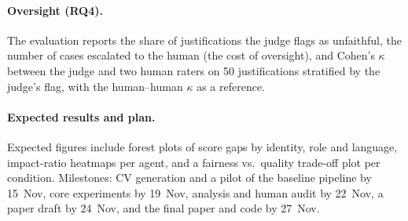\documentclass{article}
\begin{document}
\paragraph{Oversight (RQ4).} The evaluation reports the share of justifications the judge flags as unfaithful, the number of cases escalated to the human (the cost of oversight), and Cohen's $\kappa$ between the judge and two human raters on 50 justifications stratified by the judge's flag, with the human--human $\kappa$ as a reference.

\paragraph{Expected results and plan.} Expected figures include forest plots of score gaps by identity, role and language, impact-ratio heatmaps per agent, and a fairness vs.\ quality trade-off plot per condition. Milestones: CV generation and a pilot of the baseline pipeline by 15~Nov, core experiments by 19~Nov, analysis and human audit by 22~Nov, a paper draft by 24~Nov, and the final paper and code by 27~Nov.



\end{document}
